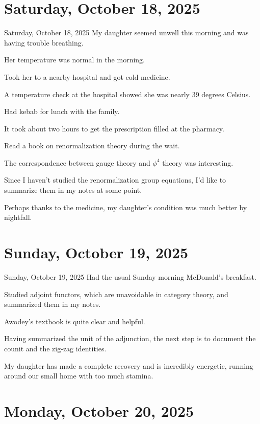 \documentclass[dvipdfmx, autodetect-engine, aspectratio=169, 10.5pt]{beamer}
\begin{document}
\section{Saturday, October 18, 2025}

\begin{frame}{Saturday, October 18, 2025}
	My daughter seemed unwell this morning and was having trouble breathing.

	Her temperature was normal in the morning.

	Took her to a nearby hospital and got cold medicine.

	A temperature check at the hospital showed she was nearly 39 degrees Celsius.

	Had kebab for lunch with the family.

	It took about two hours to get the prescription filled at the pharmacy.

	Read a book on renormalization theory during the wait.

	The correspondence between gauge theory and $\phi^{4}$ theory was interesting.

	Since I haven't studied the renormalization group equations, I'd like to summarize them in my notes at some point.

	Perhaps thanks to the medicine, my daughter's condition was much better by nightfall.
\end{frame}

\section{Sunday, October 19, 2025}

\begin{frame}{Sunday, October 19, 2025}
	Had the usual Sunday morning McDonald's breakfast.

	Studied adjoint functors, which are unavoidable in category theory, and summarized them in my notes.

	Awodey's textbook is quite clear and helpful.

	Having summarized the unit of the adjunction, the next step is to document the counit and the zig-zag identities.

	My daughter has made a complete recovery and is incredibly energetic, running around our small home with too much stamina.
\end{frame}

\section{Monday, October 20, 2025}
\end{document}
